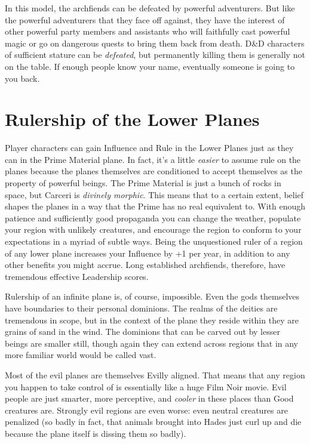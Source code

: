 In this model, the archfiends can be defeated by powerful adventurers. But like the powerful adventurers that they face off against, they have the interest of other powerful party members and assistants who will faithfully cast powerful magic or go on dangerous quests to bring them back from death. D\&D characters of sufficient stature can be \textit{defeated}, but permanently killing them is generally not on the table. If enough people know your name, eventually someone is going to  you back.


\section{Rulership of the Lower Planes}

Player characters can gain Influence and Rule in the Lower Planes just as they can in the Prime Material plane. In fact, it's a little \textit{easier} to assume rule on the planes because the planes themselves are conditioned to accept themselves as the property of powerful beings. The Prime Material is just a bunch of rocks in space, but Carceri is \textit{divinely morphic}. This means that to a certain extent, belief shapes the planes in a way that the Prime has no real equivalent to. With enough patience and sufficiently good propaganda you can change the weather, populate your region with unlikely creatures, and encourage the region to conform to your expectations in a myriad of subtle ways. Being the unquestioned ruler of a region of any lower plane increases your Influence by +1 per year, in addition to any other benefits you might accrue. Long established archfiends, therefore, have tremendous effective Leadership scores.

Rulership of an infinite plane is, of course, impossible. Even the gods themselves have boundaries to their personal dominions. The realms of the deities are tremendous in scope, but in the context of the plane they reside within they are grains of sand in the wind. The dominions that can be carved out by lesser beings are smaller still, though again they can extend across regions that in any more familiar world would be called vast.

Most of the evil planes are themselves Evilly aligned. That means that any region you happen to take control of is essentially like a huge Film Noir movie. Evil people are just smarter, more perceptive, and \textit{cooler} in these places than Good creatures are. Strongly evil regions are even worse: even neutral creatures are penalized (so badly in fact, that animals brought into Hades just curl up and die because the plane itself is dissing them so badly).


